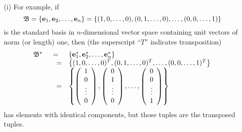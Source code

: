 {\color{blue}
\bexample
\begin{itemize}
\item[(i)]
For example,
if $$
{\frak B}=\{{\bf e}_1, {\bf e}_2,\ldots ,{\bf e}_n\}
=\{
(1,0,\ldots,0),
(0,1,\ldots,0),
\ldots,
(0,0,\ldots,1)\}$$
is the standard basis in $n$-dimensional vector space containing unit vectors of norm (or length) one,
then  (the superscript ``$T$'' indicates transposition)
$$
\begin{array}{rcl}
{\frak B}^*
&=&\{{\bf e}_1^* ,{\bf e}_2^*, \ldots ,{\bf e}_n^* \}\\
&\quad =&\left\{
(1,0,\ldots,0)^T,
(0,1,\ldots,0)^T,
\ldots,
(0,0,\ldots,1)^T\right\}  \\
&\quad =&  \left\{
\left(
\begin{array}{c}
1\\
0\\
\vdots \\
0
\end{array}
\right),
\left(
\begin{array}{c}
0\\
1\\
\vdots \\
0
\end{array}
\right),
\ldots ,
\left(
\begin{array}{c}
0\\
0\\
\vdots \\
1
\end{array}
\right)
\right\}
\end{array}
$$
has elements with identical components,
but those tuples are the transposed tuples.


\end{itemize}}
